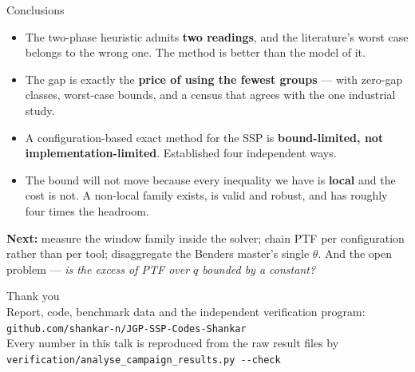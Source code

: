 \documentclass[11pt,aspectratio=169]{beamer}
\newcommand{\new}[1]{{\color{cAccent}#1}}
\newcommand{\keyline}[1]{\vspace{0.4em}{\color{cRule}\rule{\textwidth}{0.4pt}}\vspace{0.3em}\par#1}
\begin{document}
\begin{frame}{Conclusions}
\vspace{0.1em}
\begin{itemize}\itemsep3pt\small
  \item The two-phase heuristic admits \textbf{two readings}, and the literature's worst
  case belongs to the wrong one. The method is better than the model of it.
  \item The gap is exactly the \textbf{price of using the fewest groups} --- with zero-gap
  classes, worst-case bounds, and a census that agrees with the one industrial study.
  \item A configuration-based exact method for the SSP is \textbf{bound-limited, not
  implementation-limited}. Established four independent ways.
  \item The bound will not move because every inequality we have is \textbf{local} and
  the cost is not. \new{A non-local family exists, is valid and robust, and has roughly
  four times the headroom.}
\end{itemize}
\vspace{0.4em}
\keyline{}
\small\textbf{Next:} measure the window family inside the solver; chain PTF per configuration
rather than per tool; disaggregate the Benders master's single $\theta$. And the open
problem --- \emph{is the excess of PTF over $q$ bounded by a constant?}
\end{frame}

\begin{frame}[plain]
\vspace{2.2em}
\centering
{\Large Thank you}\\[1.6em]
{\small Report, code, benchmark data and the independent verification program:\\
\texttt{github.com/shankar-n/JGP-SSP-Codes-Shankar}}\\[1.2em]
{\footnotesize\color{cGrey} Every number in this talk is reproduced from the raw result
files by\\ \texttt{verification/analyse\_campaign\_results.py -{}-check}}
\end{frame}

\appendix
\end{document}
